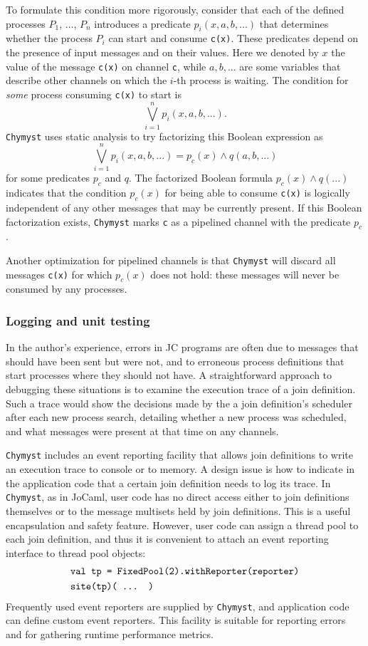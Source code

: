\documentclass[sigplan,10pt,review,anonymous]{acmart}\settopmatter{printfolios=true}
\begin{document}
To formulate this condition more rigorously, consider that each of
the defined processes $P_{1}$, ..., $P_{n}$ introduces a predicate
$p_{i}(x,a,b,...)$ that determines whether the process $P_{i}$ can
start and consume \texttt{c(x)}. These predicates depend on the presence
of input messages and on their values. Here we denoted by $x$ the
value of the message \texttt{c(x)} on channel \texttt{c}, while $a,b,...$
are some variables that describe other channels on which the $i$-th
process is waiting. The condition for \emph{some} process consuming
\texttt{c(x)} to start is
\[
\bigvee_{i=1}^{n}p_{i}(x,a,b,...).
\]
 \texttt{Chymyst} uses static analysis to try factorizing this Boolean
expression as
\[
\bigvee_{i=1}^{n}p_{i}(x,a,b,...)=p_{c}(x)\wedge q(a,b,...)
\]
for some predicates $p_{c}$ and $q$. The factorized Boolean formula
$p_{c}(x)\wedge q(...)$ indicates that the condition $p_{c}(x)$
for being able to consume \texttt{c(x)} is logically independent of
any other messages that may be currently present. If this Boolean
factorization exists, \texttt{Chymyst} marks \texttt{c} as a pipelined
channel with the predicate $p_{c}$. 

Another optimization for pipelined channels is that \texttt{Chymyst}
will discard all messages \texttt{c(x)} for which $p_{c}(x)$ does
not hold: these messages will never be consumed by any processes.

\subsubsection{Logging and unit testing}

In the author's experience, errors in JC programs are often due to
messages that should have been sent but were not, and to erroneous
process definitions that start processes where they should not have.
A straightforward approach to debugging these situations is to examine
the execution trace of a join definition. Such a trace would show
the decisions made by the a join definition's scheduler after each
new process search, detailing whether a new process was scheduled,
and what messages were present at that time on any channels.

\texttt{Chymyst} includes an event reporting facility that allows
join definitions to write an execution trace to console or to memory.
A design issue is how to indicate in the application code that a certain
join definition needs to log its trace. In \texttt{Chymyst}, as in
JoCaml, user code has no direct access either to join definitions
themselves or to the message multisets held by join definitions. This
is a useful encapsulation and safety feature. However, user code can
assign a thread pool to each join definition, and thus it is convenient
to attach an event reporting interface to thread pool objects:
\begin{align*}
 & \text{\texttt{val tp = FixedPool(2).withReporter(reporter)}}\\
 & \text{\texttt{site(tp)( ... )}}
\end{align*}
Frequently used event reporters are supplied by \texttt{Chymyst},
and application code can define custom event reporters. This facility
is suitable for reporting errors and for gathering runtime performance
metrics. 
\end{document}
